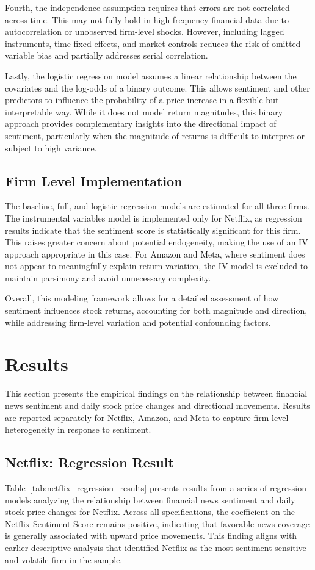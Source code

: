 \documentclass[12pt]{article}
\begin{document}
Fourth, the independence assumption requires that errors are not correlated across time. This may not fully hold in high-frequency financial data due to autocorrelation or unobserved firm-level shocks. However, including lagged instruments, time fixed effects, and market controls reduces the risk of omitted variable bias and partially addresses serial correlation.

Lastly, the logistic regression model assumes a linear relationship between the covariates and the log-odds of a binary outcome. This allows sentiment and other predictors to influence the probability of a price increase in a flexible but interpretable way. While it does not model return magnitudes, this binary approach provides complementary insights into the directional impact of sentiment, particularly when the magnitude of returns is difficult to interpret or subject to high variance.

\subsection{Firm Level Implementation}
The baseline, full, and logistic regression models are estimated for all three firms. The instrumental variables model is implemented only for Netflix, as regression results indicate that the sentiment score is statistically significant for this firm. This raises greater concern about potential endogeneity, making the use of an IV approach appropriate in this case. For Amazon and Meta, where sentiment does not appear to meaningfully explain return variation, the IV model is excluded to maintain parsimony and avoid unnecessary complexity.

Overall, this modeling framework allows for a detailed assessment of how sentiment influences stock returns, accounting for both magnitude and direction, while addressing firm-level variation and potential confounding factors.



\section{Results}
\label{sec:results}

This section presents the empirical findings on the relationship between financial news sentiment and daily stock price changes and directional movements. Results are reported separately for Netflix, Amazon, and Meta to capture firm-level heterogeneity in response to sentiment.

\subsection{Netflix: Regression Result
}
Table~\ref{tab:netflix_regression_results} presents results from a series of regression models analyzing the relationship between financial news sentiment and daily stock price changes for Netflix. Across all specifications, the coefficient on the Netflix Sentiment Score remains positive, indicating that favorable news coverage is generally associated with upward price movements. This finding aligns with earlier descriptive analysis that identified Netflix as the most sentiment-sensitive and volatile firm in the sample.
\end{document}
